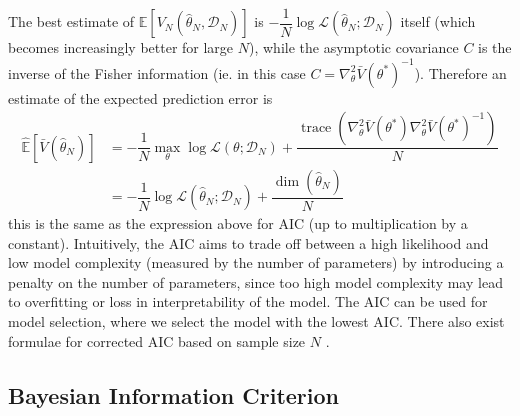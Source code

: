 \documentclass[11pt]{report} %
\begin{document}
The best estimate of $\mathbb{E}\left[V_{N}\left(\hat{\theta}_{N}, \mathcal{D}_{N}\right)\right]$ is $-\dfrac{1}{N}\log\mathcal{L}\left(\hat{\theta}_{N}; \mathcal{D}_{N}\right)$ itself (which becomes increasingly better for large $N$), while the asymptotic covariance $C$ is the inverse of the Fisher information (ie. in this case $C = \nabla_{\theta}^{2}\bar{V}\left(\theta^{*}\right)^{-1}$). Therefore an estimate of the expected prediction error is
\begin{align}
\widehat{\mathbb{E}}\left[\bar{V}\left(\hat{\theta}_{N}\right)\right] &= -\dfrac{1}{N}\max_{\theta}\log\mathcal{L}\left(\theta; \mathcal{D}_{N}\right) + \dfrac{\operatorname{trace}\left(\nabla_{\theta}^{2}\bar{V}\left(\theta^{*}\right)\nabla_{\theta}^{2}\bar{V}\left(\theta^{*}\right)^{-1}\right)}{N} \\
&= -\dfrac{1}{N}\log\mathcal{L}\left(\hat{\theta}_{N}; \mathcal{D}_{N}\right) + \dfrac{\dim\left(\hat{\theta}_{N}\right)}{N}
\end{align}
this is the same as the expression above for AIC (up to multiplication by a constant). Intuitively, the AIC aims to trade off between a high likelihood and low model complexity (measured by the number of parameters) by introducing a penalty on the number of parameters, since too high model complexity may lead to overfitting or loss in interpretability of the model. The AIC can be used for model selection, where we select the model with the lowest AIC. There also exist formulae for corrected AIC based on sample size $N$ \cite{Claeskens2008}.

\subsection{Bayesian Information Criterion}
\end{document}
